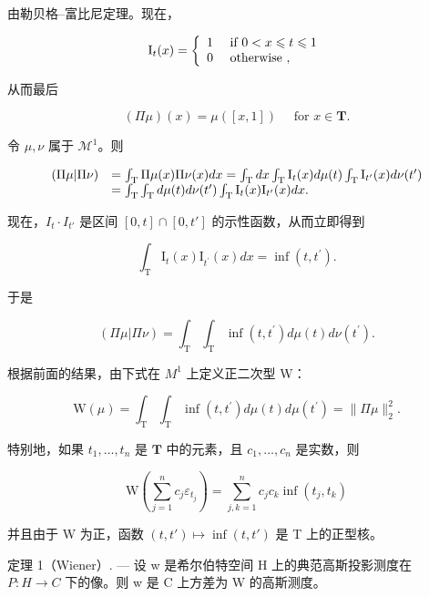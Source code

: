 由勒贝格--富比尼定理。现在，

\[
\mathrm{I} _ {t} (x) = \left\{ \begin{array}{l l} 1 & \text { if } 0 <   x \leqslant t \leqslant 1 \\ 0 & \text { otherwise }, \end{array} \right.
\]

从而最后

\[
(\Pi \mu) (x) = \mu ([ x, 1 ]) \quad \text { for } x \in \mathbf {T}.\tag{34}
\]

令 \(\mu, \nu\) 属于 \(\mathcal{M}^1\)。则

\[
\begin{array}{r l} (\Pi \mu | \Pi \nu) & = \int_ {\mathrm{T}} \Pi \mu (x) \Pi \nu (x) d x = \int_ {\mathrm{T}} d x \int_ {\mathrm{T}} \mathrm{I} _ {t} (x) d \mu (t) \int_ {\mathrm{T}} \mathrm{I} _ {t ^ {\prime}} (x) d \nu (t ^ {\prime}) \\ & = \int_ {\mathrm{T}} \int_ {\mathrm{T}} d \mu (t) d \nu (t ^ {\prime}) \int_ {\mathrm{T}} \mathrm{I} _ {t} (x) \mathrm{I} _ {t ^ {\prime}} (x) d x. \end{array}
\]

现在，\(I_{t} \cdot I_{t'}\) 是区间 \([0, t] \cap [0, t']\) 的示性函数，从而立即得到

\[
\int_ {\mathrm{T}} \mathrm{I} _ {t} (x) \mathrm{I} _ {t ^ {\prime}} (x) d x = \inf (t, t ^ {\prime}).\tag{35}
\]

于是

\[
(\Pi \mu | \Pi \nu) = \int_ {\mathrm{T}} \int_ {\mathrm{T}} \inf (t, t ^ {\prime}) d \mu (t) d \nu (t ^ {\prime}).\tag{36}
\]

根据前面的结果，由下式在 \(M^{1}\) 上定义正二次型 W：

\[
\mathrm{W} (\mu) = \int_ {\mathrm{T}} \int_ {\mathrm{T}} \inf (t, t ^ {\prime}) d \mu (t) d \mu (t ^ {\prime}) = \| \Pi \mu \| _ {2} ^ {2}.\tag{37}
\]

特别地，如果 \(t_1, \ldots, t_n\) 是 \(\mathbf{T}\) 中的元素，且 \(c_1, \ldots, c_n\) 是实数，则

\[
\mathrm{W} \left(\sum_ {j = 1} ^ {n} c _ {j} \varepsilon_ {t _ {j}}\right) = \sum_ {j, k = 1} ^ {n} c _ {j} c _ {k} \inf (t _ {j}, t _ {k})
\]

并且由于 W 为正，函数 \((t, t') \mapsto \inf(t, t')\) 是 T 上的正型核。

定理 1（Wiener）. --- 设 w 是希尔伯特空间 H 上的典范高斯投影测度在 \(P: H \to C\) 下的像。则 w 是 C 上方差为 W 的高斯测度。

